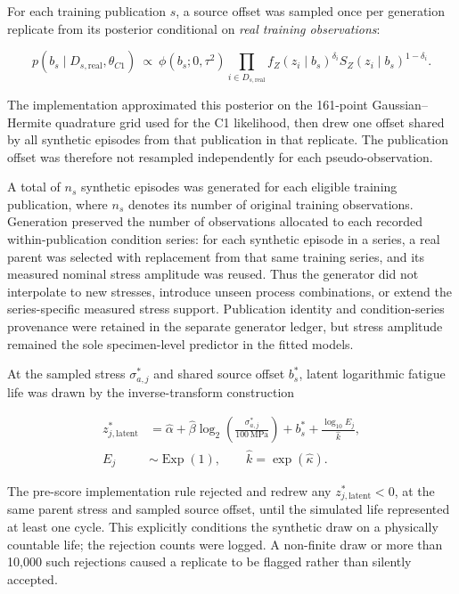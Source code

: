 \documentclass[12pt,a4paper]{article}
\begin{document}
For each training publication \(s\), a source offset was sampled once per generation replicate from its posterior conditional on \emph{real training observations}:

\begin{equation}
p(b_s\mid D_{s,\mathrm{real}},\widehat{\theta}_{C1})
\ \propto\
\phi(b_s;0,\tau^2)
\prod_{i\in D_{s,\mathrm{real}}}
f_Z(z_i\mid b_s)^{\delta_i}
S_Z(z_i\mid b_s)^{1-\delta_i}.
\tag{2.5a}
\end{equation}

The implementation approximated this posterior on the 161-point Gaussian–Hermite quadrature grid used for the C1 likelihood, then drew one offset shared by all synthetic episodes from that publication in that replicate. The publication offset was therefore not resampled independently for each pseudo-observation.

A total of \(n_s\) synthetic episodes was generated for each eligible training publication, where \(n_s\) denotes its number of original training observations. Generation preserved the number of observations allocated to each recorded within-publication condition series: for each synthetic episode in a series, a real parent was selected with replacement from that same training series, and its measured nominal stress amplitude was reused. Thus the generator did not interpolate to new stresses, introduce unseen process combinations, or extend the series-specific measured stress support. Publication identity and condition-series provenance were retained in the separate generator ledger, but stress amplitude remained the sole specimen-level predictor in the fitted models.

At the sampled stress \(\sigma_{a,j}^{*}\) and shared source offset \(b_s^{*}\), latent logarithmic fatigue life was drawn by the inverse-transform construction

\begin{equation}
\begin{aligned}
z_{j,\mathrm{latent}}^{*}
&= \widehat{\alpha}
 +\widehat{\beta}\log_2\!\left(\frac{\sigma_{a,j}^{*}}{100\,\mathrm{MPa}}\right)
 +b_s^{*}
 +\frac{\log_{10}E_j}{\widehat{k}},\\
E_j&\sim\operatorname{Exp}(1),\qquad
\widehat{k}=\exp(\widehat{\kappa}).
\end{aligned}
\tag{2.5b}
\end{equation}

The pre-score implementation rule rejected and redrew any \(z_{j,\mathrm{latent}}^{*}<0\), at the same parent stress and sampled source offset, until the simulated life represented at least one cycle. This explicitly conditions the synthetic draw on a physically countable life; the rejection counts were logged. A non-finite draw or more than 10,000 such rejections caused a replicate to be flagged rather than silently accepted.
\end{document}
